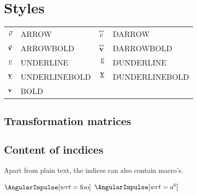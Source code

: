 \documentclass[10pt,a4paper]{article}
\begin{document}
\section{Styles}


 \begin{tabular}{ r l rl }
    $\vec{v}$ & ARROW &  $\overset{\leftrightarrow}{v}$ & DARROW \\
    $\vec{\mathbf{v}}$ & ARROWBOLD &  $\overset{\leftrightarrow}{\mathbf{v}}$ & DARROWBOLD \\
    $\UNDERLINE{v}$ & UNDERLINE &  $\DUNDERLINE{v}$ & DUNDERLINE \\
    $\UNDERLINEBOLD{v}$ & UNDERLINEBOLD &  $\DUNDERLINEBOLD{v}$ & DUNDERLINEBOLD \\
    $\mathbf{v}$ & BOLD \\
  \end{tabular}

\begin{SideBySideExample}[xrightmargin=1.2cm,frame=single]
  {
    \let\vectorformatter\VECTORPRETTYDEFAULT
    \AngularImpulse[object=1,wrt=0,around=3,expressedIn=4]
    \AngularImpulse[object=1,wrt=0,around=3,expressedIn=4,diff=4]
    \let\vectorformatter\VECTORFLAT
    \AngularImpulse[object=1,wrt=0,around=3,expressedIn=4]
    \AngularImpulse[object=1,wrt=0,around=3,expressedIn=4,diff=4]
  }
\end{SideBySideExample}

\subsection{Transformation matrices}

\begin{SideBySideExample}[xrightmargin=1cm,frame=single]
  \Transformation[frame=2,wrt=0,expressedIn=0]
  \Transformation[frame=2,wrt=0,expressedIn=1]
\end{SideBySideExample}

\subsection{Content of incdices}

Apart from plain text, the indices can also contain macro's.
\begin{SideBySideExample}[xrightmargin=1cm,frame=single]
  \def\foo{0}
  \AngularImpulse[wrt=\foo]
  \newcommand{\frm}[1]{{\{#1\}}}
  \AngularImpulse[wrt=\frm{0}]
  \AngularImpulse[wrt=a\frm{0}c]
  $\AngularImpulse[wrt=\mathrm{foo}]$
  $\AngularImpulse[wrt=a^b]$
\end{SideBySideExample}
\end{document}

